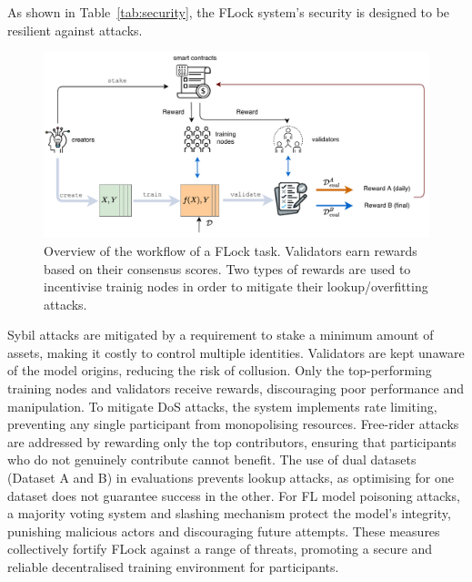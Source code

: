 \documentclass[conference]{IEEEtran}
\begin{document}
As shown in Table~\ref{tab:security}, the FLock system's security is designed to be resilient against attacks.


\begin{figure}[t]
\centering
\includegraphics[width=2\columnwidth]{figures/FLock-snt.pdf}
\caption{Overview of the workflow of a FLock \SNT task. Validators earn rewards based on their consensus scores. Two types of rewards are used to incentivise trainig nodes in order to mitigate their lookup/overfitting attacks. }
\label{fig:FLock-snt}
\end{figure}

Sybil attacks are mitigated by a requirement to stake a minimum amount of assets, making it costly to control multiple identities. Validators are kept unaware of the model origins, reducing the risk of collusion. Only the top-performing training nodes and validators receive rewards, discouraging poor performance and manipulation. To mitigate DoS attacks, the system implements rate limiting, preventing any single participant from monopolising resources. Free-rider attacks are addressed by rewarding only the top contributors, ensuring that participants who do not genuinely contribute cannot benefit. The use of dual datasets (Dataset A and B) in evaluations prevents lookup attacks, as optimising for one dataset does not guarantee success in the other. For FL model poisoning attacks, a majority voting system and slashing mechanism protect the model's integrity, punishing malicious actors and discouraging future attempts. These measures collectively fortify FLock against a range of threats, promoting a secure and reliable decentralised training environment for participants.



    
\end{document}
